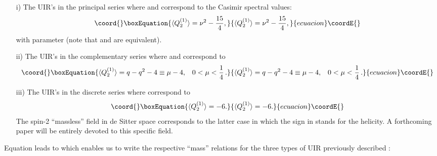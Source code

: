 \documentclass[a4paper,11pt,showpacs,preprintnumbers]{revtex4}
\def\setR{\mathbb{R}}
\begin{document}
\begin{itemize}
\item[i)] The UIR's \coordHE{} in the principal series where
\coordHE{} and \coordHE{} correspond to the Casimir
spectral values:
\begin{equation}\coord{}\boxEquation{
\langle Q_2^{(1)}\rangle=\nu^2-\frac{15}{4},
}{
\langle Q_2^{(1)}\rangle=\nu^2-\frac{15}{4},
}{ecuacion}\coordE{}\end{equation}
with parameter
\myHighlight{$\nu \in \setR$}\coordHE{} (note that \coordHE{} and \coordHE{} are
equivalent).
\item[ ii)] The UIR's \coordHE{} in the complementary series where
\coordHE{} and \coordHE{} correspond to
\begin{equation}\coord{}\boxEquation{
\langle  Q_2^{(1)}\rangle=q-q^2-4\equiv \mu-4,\;\;\;0<\mu<\frac{1}{4}\,.
}{
\langle  Q_2^{(1)}\rangle=q-q^2-4\equiv \mu-4,\;\;\;0<\mu<\frac{1}{4}\,.
}{ecuacion}\coordE{}\end{equation}
\item[iii)] The UIR's \coordHE{} in the discrete series where
\coordHE{} correspond to
\begin{equation}\coord{}\boxEquation{
\langle Q_2^{(1)}\rangle=-6 .
}{
\langle Q_2^{(1)}\rangle=-6 .
}{ecuacion}\coordE{}\end{equation}
The spin-2 ``massless'' field in de Sitter space corresponds to
the latter case in which the sign \myHighlight{$\pm$}\coordHE{} in \coordHE{}
stands for the helicity. A forthcoming paper will be entirely
devoted to this specific field.
\end{itemize}
\noindent Equation \myHighlight{$(\ref{eq:wave})$}\coordHE{} leads to \coordHE{} which enables us to write the
respective ``mass'' relations for the three types of UIR
previously described :
\end{document}
